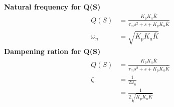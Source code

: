 \documentclass{article}
\begin{document}
\textbf{Natural frequency for Q(S)}
\begin{align*}
    Q(S) &= \frac{K_p K_a \bar{K}}{\tau_m s^2 + s + K_p K_a \bar{K}}\\
    \omega_n &= \sqrt{K_p K_a \bar{K}}
\end{align*}
\textbf{Dampening ration for Q(S)}
\begin{align*}
    Q(S) &= \frac{K_p K_a \bar{K}}{\tau_m s^2 + s + K_p K_a \bar{K}}\\
    \zeta &= \frac{1}{2\omega_n}\\
    &= \frac{1}{2\sqrt{K_p K_a \bar{K}}}
\end{align*}
\end{document}
